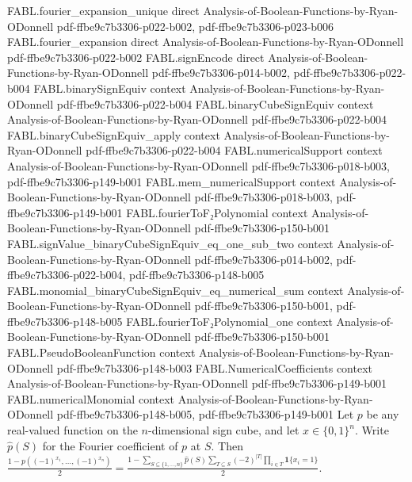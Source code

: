 \begin{theorem}
  {FABL.fourier_expansion_unique}
  {direct}
  {Analysis-of-Boolean-Functions-by-Ryan-ODonnell}
  {pdf-ffbe9c7b3306-p022-b002,
    pdf-ffbe9c7b3306-p023-b006}
\proofstep
  {FABL.fourier_expansion}
  {direct}
  {Analysis-of-Boolean-Functions-by-Ryan-ODonnell}
  {pdf-ffbe9c7b3306-p022-b002}
\proofstep
  {FABL.signEncode}
  {direct}
  {Analysis-of-Boolean-Functions-by-Ryan-ODonnell}
  {pdf-ffbe9c7b3306-p014-b002,
    pdf-ffbe9c7b3306-p022-b004}
\proofstep
  {FABL.binarySignEquiv}
  {context}
  {Analysis-of-Boolean-Functions-by-Ryan-ODonnell}
  {pdf-ffbe9c7b3306-p022-b004}
\proofstep
  {FABL.binaryCubeSignEquiv}
  {context}
  {Analysis-of-Boolean-Functions-by-Ryan-ODonnell}
  {pdf-ffbe9c7b3306-p022-b004}
\proofstep
  {FABL.binaryCubeSignEquiv_apply}
  {context}
  {Analysis-of-Boolean-Functions-by-Ryan-ODonnell}
  {pdf-ffbe9c7b3306-p022-b004}
\proofstep
  {FABL.numericalSupport}
  {context}
  {Analysis-of-Boolean-Functions-by-Ryan-ODonnell}
  {pdf-ffbe9c7b3306-p018-b003,
    pdf-ffbe9c7b3306-p149-b001}
\proofstep
  {FABL.mem_numericalSupport}
  {context}
  {Analysis-of-Boolean-Functions-by-Ryan-ODonnell}
  {pdf-ffbe9c7b3306-p018-b003,
    pdf-ffbe9c7b3306-p149-b001}
\proofstep
  {FABL.fourierToF₂Polynomial}
  {context}
  {Analysis-of-Boolean-Functions-by-Ryan-ODonnell}
  {pdf-ffbe9c7b3306-p150-b001}
\proofstep
  {FABL.signValue_binaryCubeSignEquiv_eq_one_sub_two}
  {context}
  {Analysis-of-Boolean-Functions-by-Ryan-ODonnell}
  {pdf-ffbe9c7b3306-p014-b002,
    pdf-ffbe9c7b3306-p022-b004,
    pdf-ffbe9c7b3306-p148-b005}
\proofstep
  {FABL.monomial_binaryCubeSignEquiv_eq_numerical_sum}
  {context}
  {Analysis-of-Boolean-Functions-by-Ryan-ODonnell}
  {pdf-ffbe9c7b3306-p150-b001,
    pdf-ffbe9c7b3306-p148-b005}
\proofstep
  {FABL.fourierToF₂Polynomial_one}
  {context}
  {Analysis-of-Boolean-Functions-by-Ryan-ODonnell}
  {pdf-ffbe9c7b3306-p150-b001}
\proofstep
  {FABL.PseudoBooleanFunction}
  {context}
  {Analysis-of-Boolean-Functions-by-Ryan-ODonnell}
  {pdf-ffbe9c7b3306-p148-b003}
\proofstep
  {FABL.NumericalCoefficients}
  {context}
  {Analysis-of-Boolean-Functions-by-Ryan-ODonnell}
  {pdf-ffbe9c7b3306-p149-b001}
\proofstep
  {FABL.numericalMonomial}
  {context}
  {Analysis-of-Boolean-Functions-by-Ryan-ODonnell}
  {pdf-ffbe9c7b3306-p148-b005,
    pdf-ffbe9c7b3306-p149-b001}
Let $p$ be any real-valued function on the $n$-dimensional sign cube, and let
$x\in\{0,1\}^n$. Write $\widehat p(S)$ for the Fourier coefficient of $p$ at $S$. Then
$\displaystyle\frac{1-p((-1)^{x_1},\ldots,(-1)^{x_n})}{2}=\frac{1-\sum_{S\subseteq\{1,\ldots,n\}}\widehat
p(S)\sum_{T\subseteq S}(-2)^{|T|}\prod_{i\in T}\mathbf{1}\{x_i=1\}}{2}$.
\end{theorem}

